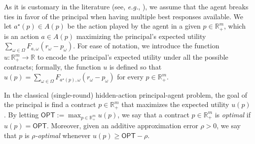 As it is customary in the literature (see, \emph{e.g.}, \citep{dutting2019simple}), we assume that the agent breaks ties in favor of the principal when having multiple best responses available.
%
We let $a^\star(p) \in A(p)$ be the action played by the agent in a given $p \in \mathbb{R}^{m}_{+}$, which is an action $a \in A(p)$ maximizing the principal's expected utility $\sum_{\omega \in \Omega}F_{a,\omega} \left( r_\omega - p_{\omega} \right)$.
%
For ease of notation, we introduce the function $u: \mathbb{R}^{m}_{+} \to \mathbb{R}$ to encode the principal's expected utility under all the possible contracts; formally, the function $u$ is defined so that $u(p) = \sum_{\omega \in \Omega}F_{a^\star(p),\omega} \left( r_\omega - p_{\omega} \right)$ for every $p \in \mathbb{R}^{m}_{+}$.


In the classical (single-round) hidden-action principal-agent problem, the goal of the principal is find a contract $p \in \mathbb{R}^{m}_{+}$ that maximizes the expected utility $u(p)$.
%
By letting $\mathsf{OPT} := \max_{p \in \mathbb{R}^{m}_{+}} u(p)$, we say that a contract $p \in \mathbb{R}^{m}_{+}$ is \emph{optimal} if $u(p) = \mathsf{OPT}$.
%
Moreover, given an additive approximation error $\rho > 0$, we say that $p$ is \emph{$\rho$-optimal} whenever $u(p) \geq \mathsf{OPT} -\rho$.





